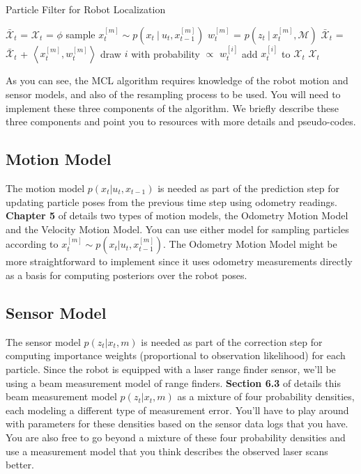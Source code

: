 \documentclass[12pt, a4paper]{article}
\begin{document}
\begin{algorithm}[!htbp]
	\caption{Particle Filter for Robot Localization}\label{algo:mclAlgo}
	\begin{algorithmic}[1]
		\State $\bar{\mathcal{X}}_t$ = ${\mathcal{X}}_t$ = $\phi$
		\State sample $x^{[m]}_t\sim p(x_t\ |\ u_t,x^{[m]}_{t-1})$
		\State $w^{[m]}_t$ = $ p(z_t\ |\ x^{[m]}_{t}, \mathcal{M})$
		\State $\bar{\mathcal{X}}_t$ = $\bar{\mathcal{X}}_t$ + $\left<x^{[m]}_t, w^{[m]}_t\right>$
		\EndFor
		\State draw $i$ with probability $\propto$ $w^{[i]}_t$
		\State add $x^{[i]}_t$ to ${\mathcal{X}}_t$
		\EndFor
		\State \Return ${\mathcal{X}}_t$
	\end{algorithmic}
\end{algorithm}

As you can see, the MCL algorithm requires knowledge of the robot
motion and sensor models, and also of the resampling process to be
used. You will need to implement these three components of the algorithm.
We briefly describe these three components and point you to
resources with more details and pseudo-codes.

\subsection*{Motion Model}

The motion model $p(x_t|u_t,x_{t-1})$ is needed as part of the prediction
step for updating particle poses from the previous time step using
odometry readings. \textbf{Chapter 5 }of \cite{thrun2005probabilistic}
details two types of motion models, the Odometry Motion Model and
the Velocity Motion Model. You can use either model for sampling particles
according to $x^{[m]}_t\sim p(x_t|u_t,x^{[m]}_{t-1})$. The Odometry
Motion Model might be more straightforward to implement since it
uses odometry measurements directly as a basis for computing posteriors
over the robot poses.

\subsection*{Sensor Model}

The sensor model $p(z_t|x_t,m)$ is needed as part of the correction
step for computing importance weights (proportional to observation
likelihood) for each particle. Since the robot is equipped with a
laser range finder sensor, we'll be using a beam measurement model
of range finders. \textbf{Section 6.3 }of \cite{thrun2005probabilistic}
details this beam measurement model $p(z_t|x_t,m)$ as a mixture of
four probability densities, each modeling a different type of measurement
error. You'll have to play around with parameters for these densities
based on the sensor data logs that you have. You are also free to
go beyond a mixture of these four probability densities and use a
measurement model that you think describes the observed laser scans
better.
\end{document}
